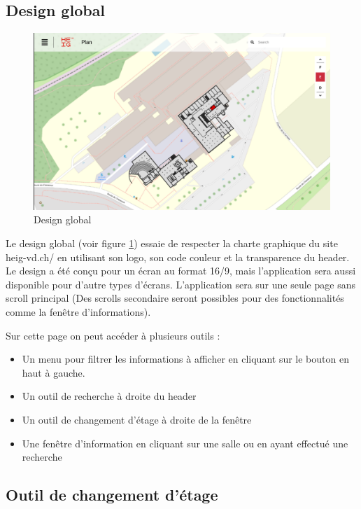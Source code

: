 \documentclass[
    iai, %
    il, %
]{heig-tb}
\begin{document}
\subsection{Design global}

\begin{figure}[h]
    \centering
    \includegraphics[scale=0.4]{designGlobal.png}
    \caption{Design global}
    \label{fig:globalDesign}
\end{figure}

Le design global (voir figure \ref{fig:globalDesign}) essaie de respecter la charte graphique du site heig-vd.ch/ en utilisant son logo, son code couleur et la transparence du header.
Le design a été conçu pour un écran au format 16/9, mais l'application sera aussi disponible pour d'autre types d'écrans.
L'application sera sur une seule page sans scroll principal
(Des scrolls secondaire seront possibles pour des fonctionnalités comme la fenêtre d'informations).

Sur cette page on peut accéder à plusieurs outils :

\begin{itemize}
    \item Un menu pour filtrer les informations à afficher en cliquant sur le bouton en haut à gauche.
    \item Un outil de recherche à droite du header
    \item Un outil de changement d'étage à droite de la fenêtre
    \item Une fenêtre d'information en cliquant sur une salle ou en ayant effectué une recherche
\end{itemize}

\subsection{Outil de changement d'étage}
\end{document}
